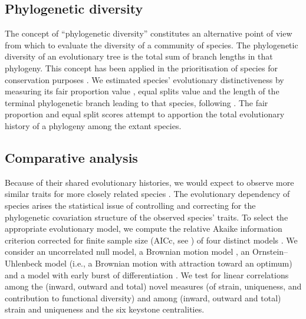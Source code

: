 \documentclass[]{rsos}%
\begin{document}
\subsection{Phylogenetic diversity}
The concept of ``phylogenetic diversity'' \citep{faith1992conservation,hartmann2007phylogenetic}
constitutes an alternative point of view from which to evaluate the diversity of a
community of species. The phylogenetic diversity of an evolutionary tree is the total sum of branch lengths in that
phylogeny. This concept has been applied in the prioritisation of species
for conservation purposes \citep{faith1992conservation,mace2003preserving}.  We
estimated species' evolutionary distinctiveness by
measuring its fair proportion value \citep{isaac2007mammals}, equal
splits value \citep{redding2006incorporating} and the length of the terminal
phylogenetic branch leading to that species, following \citet{faye2015valuing}.
The fair proportion and equal split scores attempt to apportion the total
evolutionary  history of a phylogeny among the extant species.

\subsection{Comparative analysis}
Because of their shared evolutionary histories, we would expect to observe more similar
traits for more closely related species \citep{cavalli1967phylogenetic,felsenstein1985phylogenies}. 
The evolutionary dependency of species arises the statistical issue of controlling and correcting
for the phylogenetic covariation structure of the observed species' traits.
To select the appropriate evolutionary model, we compute the relative Akaike information criterion
corrected for finite sample size (AICc, see \citet{hurvich1989regression})
of four distinct models \citep{garamszegi2014multimodel}. We
consider an uncorrelated null model, a Brownian motion model
\citep{felsenstein1985phylogenies}, an Ornstein--Uhlenbeck model \citep{hansen1997stabilizing} (i.e.,
a Brownian motion with attraction toward an optimum) and a model with early
burst of differentiation \citep{harmon2010early}.
We test for linear correlations among the (inward, outward and total) novel measures (of strain,
uniqueness, and contribution to functional diversity) and among (inward, outward and total)
strain and uniqueness and the six keystone centralities.

\end{document}
